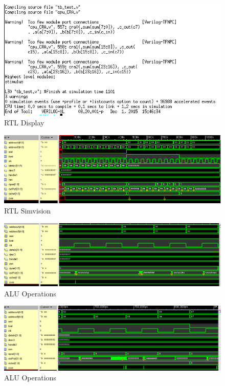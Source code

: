 \documentclass[12pt]{article}
\begin{document}
\begin{figure}[H]
\centering
\includegraphics[width=.7\linewidth]{../CRA/test-text}
\caption{RTL Display}
\label{fig:test-text-CRA}
\end{figure}

\begin{figure}[H]
\centering
\includegraphics[width=1\linewidth]{../CRA/test-test}
\caption{RTL Simvision}
\label{fig:test-test-CRA}
\end{figure}


\begin{figure}[H]
\centering
\includegraphics[width=\linewidth]{../CRA/alu1-test}
\caption{ALU Operations}
\label{fig:alu1-CRA}
\end{figure}

\begin{figure}[H]
\centering
\includegraphics[width=1\linewidth]{../CRA/alu2-test}
\caption{ALU Operations}
\label{fig:alu2-CRA}
\end{figure}
\end{document}
